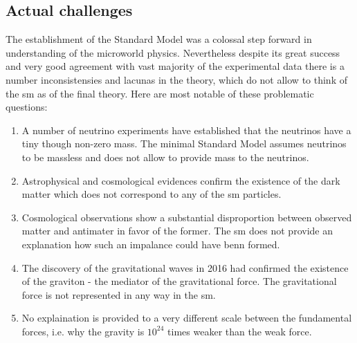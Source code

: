 \subsection{Actual challenges}

The establishment of the Standard Model was a colossal step forward in understanding of the microworld physics. Nevertheless despite its great success and very good agreement with vast majority of the experimental data there is a number inconsistensies and lacunas in the theory, which do not allow to think of the \gls{sm} as of the final theory. Here are most notable of these problematic questions:
\begin{enumerate}
	\item A number of neutrino experiments have established that the neutrinos have a tiny though non-zero mass. The minimal Standard Model assumes neutrinos to be massless and does not allow to provide mass to the neutrinos. 
	\item Astrophysical and cosmological evidences confirm the existence of the dark matter which does not correspond to any of the \gls{sm} particles. 
	\item Cosmological observations show a substantial disproportion between observed matter and antimater in favor of the former. The \gls{sm} does not provide an explanation how such an impalance could have benn formed.
	\item The discovery of the gravitational waves in 2016 had confirmed the existence of the graviton - the mediator of the gravitational force. The gravitational force is not represented in any way in the \gls{sm}.
	\item No explaination is provided to a very different scale between the fundamental forces, i.e. why the gravity is $10^{24}$ times weaker than the weak force. 
\end{enumerate}

